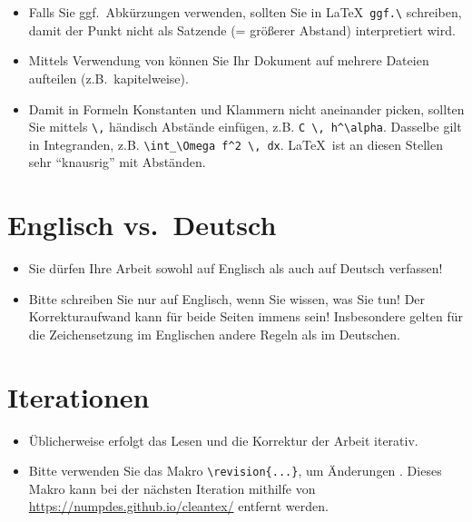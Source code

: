 \begin{itemize}
  \item Falls Sie ggf.\ Abkürzungen verwenden, sollten Sie in \LaTeX\ \verb$ggf.\$ schreiben, damit der Punkt nicht als Satzende (= größerer Abstand) interpretiert wird.

  \item Mittels Verwendung von \verb$$ können Sie Ihr Dokument auf mehrere Dateien aufteilen (z.B.\ kapitelweise).

  \item Damit in Formeln Konstanten und Klammern nicht aneinander picken, sollten Sie mittels \verb$\,$ händisch Abstände einfügen, z.B. \verb$C \, h^\alpha$. Dasselbe gilt in Integranden, z.B. \verb$\int_\Omega f^2 \, dx$. \LaTeX\ ist an diesen Stellen sehr "`knausrig"' mit Abständen.
\end{itemize}

\section{Englisch vs.\ Deutsch}

\begin{itemize}

  \item Sie dürfen Ihre Arbeit sowohl auf Englisch als auch auf Deutsch verfassen!

  \item Bitte schreiben Sie nur auf Englisch, wenn Sie wissen, was Sie tun! Der Korrekturaufwand kann für beide Seiten immens sein! Insbesondere gelten für die Zeichensetzung im Englischen andere Regeln als im Deutschen.

\end{itemize}

\section{Iterationen}

\begin{itemize}

  \item Üblicherweise erfolgt das Lesen und die Korrektur der Arbeit iterativ.
  \item Bitte verwenden Sie das Makro \verb$\revision{...}$, um Änderungen .
  Dieses Makro kann bei der nächsten Iteration mithilfe von \url{https://numpdes.github.io/cleantex/} entfernt werden.

\end{itemize}
